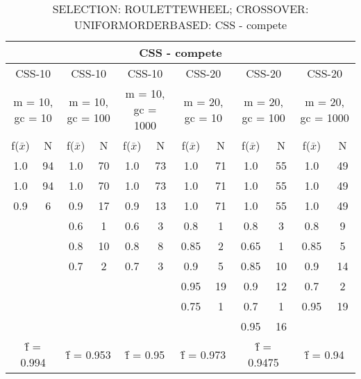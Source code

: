 \begin{table}[H]
	\centering
	\caption{SELECTION: ROULETTEWHEEL; CROSSOVER: UNIFORMORDERBASED: CSS - compete}
	\begin{adjustbox}{width=1\textwidth}
		\begin{tabular}{ |c|c||c|c||c|c||c|c||c|c||c|c| }
			\hline
			\multicolumn{12}{|c|}{CSS - compete} \\
			\hline
			\multicolumn{2}{|c||}{CSS-10} & \multicolumn{2}{c||}{CSS-10} & \multicolumn{2}{c||}{CSS-10} & \multicolumn{2}{c||}{CSS-20} & \multicolumn{2}{c||}{CSS-20} & \multicolumn{2}{c|}{CSS-20}\\
			\hline
			\multicolumn{2}{|c||}{m = 10, gc = 10} & \multicolumn{2}{c||}{m = 10, gc = 100} & \multicolumn{2}{c||}{m = 10, gc = 1000} & \multicolumn{2}{c||}{m = 20, gc = 10} & \multicolumn{2}{c||}{m = 20, gc = 100} & \multicolumn{2}{c|}{m = 20, gc = 1000}\\
			\hline
			f($\bar{x}$) & N & f($\bar{x}$) & N & f($\bar{x}$) & N & f($\bar{x}$) & N & f($\bar{x}$) & N & f($\bar{x}$) & N\\
			\hline
			\hline
			1.0 & 94 & 1.0 & 70 & 1.0 & 73 & 1.0 & 71 & 1.0 & 55 & 1.0 & 49\\
			\hline
			1.0 & 94 & 1.0 & 70 & 1.0 & 73 & 1.0 & 71 & 1.0 & 55 & 1.0 & 49\\
			0.9 & 6 & 0.9 & 17 & 0.9 & 13 & 1.0 & 71 & 1.0 & 55 & 1.0 & 49\\
			&   & 0.6 & 1 & 0.6 & 3 & 0.8 & 1 & 0.8 & 3 & 0.8 & 9\\
			&   & 0.8 & 10 & 0.8 & 8 & 0.85 & 2 & 0.65 & 1 & 0.85 & 5\\
			&   & 0.7 & 2 & 0.7 & 3 & 0.9 & 5 & 0.85 & 10 & 0.9 & 14\\
			&   &   &   &   &   & 0.95 & 19 & 0.9 & 12 & 0.7 & 2\\
			&   &   &   &   &   & 0.75 & 1 & 0.7 & 1 & 0.95 & 19\\
			&   &   &   &   &   &   &   & 0.95 & 16 &   &  \\
			\hline
			\multicolumn{2}{|c||}{\^{f} = 0.994} & \multicolumn{2}{c||}{\^{f} = 0.953} & \multicolumn{2}{c||}{\^{f} = 0.95} & \multicolumn{2}{c||}{\^{f} = 0.973} & \multicolumn{2}{c||}{\^{f} = 0.9475} & \multicolumn{2}{c|}{\^{f} = 0.94}\\
			\hline
		\end{tabular}
	\end{adjustbox}
\end{table}
